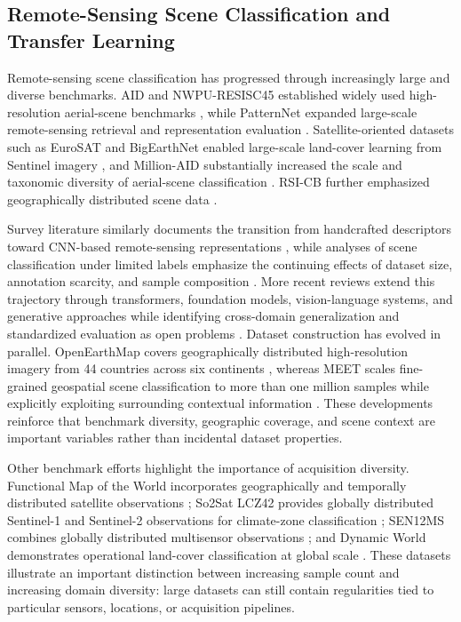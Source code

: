 \subsection{Remote-Sensing Scene Classification and Transfer Learning}

Remote-sensing scene classification has progressed through increasingly large and diverse benchmarks. AID and NWPU-RESISC45 established widely used high-resolution aerial-scene benchmarks \cite{xia2017aid,cheng2017resisc45}, while PatternNet expanded large-scale remote-sensing retrieval and representation evaluation \cite{zhou2018patternnet}. Satellite-oriented datasets such as EuroSAT and BigEarthNet enabled large-scale land-cover learning from Sentinel imagery \cite{helber2019eurosat,sumbul2019bigearthnet}, and Million-AID substantially increased the scale and taxonomic diversity of aerial-scene classification \cite{long2021millionaid}. RSI-CB further emphasized geographically distributed scene data \cite{li2020rsicb}.

Survey literature similarly documents the transition from handcrafted descriptors toward CNN-based remote-sensing representations \cite{song2019cnnsurvey}, while analyses of scene classification under limited labels emphasize the continuing effects of dataset size, annotation scarcity, and sample composition \cite{dutta2023scarcitysurvey}. More recent reviews extend this trajectory through transformers, foundation models, vision-language systems, and generative approaches while identifying cross-domain generalization and standardized evaluation as open problems \cite{huang2026scenesurvey}. Dataset construction has evolved in parallel. OpenEarthMap covers geographically distributed high-resolution imagery from 44 countries across six continents \cite{xia2023openearthmap}, whereas MEET scales fine-grained geospatial scene classification to more than one million samples while explicitly exploiting surrounding contextual information \cite{li2025meet}. These developments reinforce that benchmark diversity, geographic coverage, and scene context are important variables rather than incidental dataset properties.


Other benchmark efforts highlight the importance of acquisition diversity. Functional Map of the World incorporates geographically and temporally distributed satellite observations \cite{christie2018fmow}; So2Sat LCZ42 provides globally distributed Sentinel-1 and Sentinel-2 observations for climate-zone classification \cite{zhu2020so2sat}; SEN12MS combines globally distributed multisensor observations \cite{schmitt2019sen12ms}; and Dynamic World demonstrates operational land-cover classification at global scale \cite{brown2022dynamicworld}. These datasets illustrate an important distinction between increasing sample count and increasing domain diversity: large datasets can still contain regularities tied to particular sensors, locations, or acquisition pipelines.

